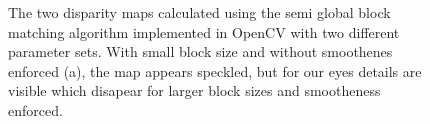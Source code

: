 \documentclass[11pt,a4paper]{article}
\begin{document}
\begin{figure}
\centering
{}




\caption{The two disparity maps calculated using the semi global block matching algorithm implemented in OpenCV with two different parameter sets. With small block size and without smoothenes enforced (a), the map appears speckled, but for our eyes details are visible which disapear for larger block sizes and smootheness enforced.}%
\label{fig:4}
\end{figure}

\FloatBarrier
\end{document}
